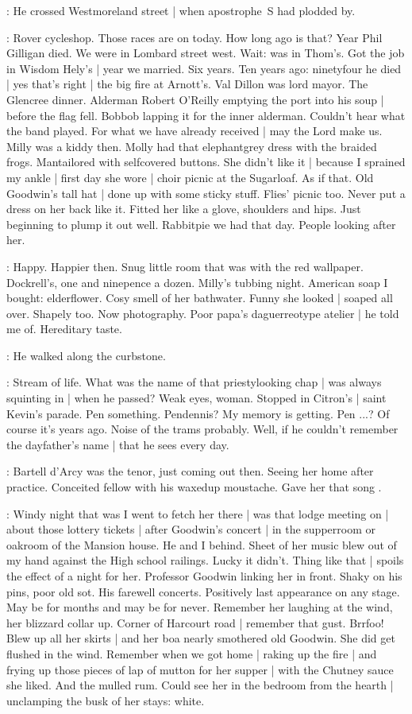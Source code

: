 :
He crossed Westmoreland street |
when apostrophe~S had plodded by.

\BloomInt:
Rover cycleshop.
Those races are on today.
How long ago is that?
Year Phil Gilligan died.
We were in Lombard street west.
Wait:
was in Thom's.
Got the job in Wisdom Hely's |
year we married.
Six years.
Ten years ago:
ninetyfour he died |
yes that's right |
the big fire at Arnott's.
Val Dillon was lord mayor.
The Glencree dinner.
Alderman Robert O'Reilly emptying the port into his soup |
before the flag fell.
Bobbob lapping it for the inner alderman.
Couldn't hear what the band played.
For what we have already received |
may the Lord make us.
Milly was a kiddy then.
Molly had that elephantgrey dress with the braided frogs.
Mantailored with selfcovered buttons.
She didn't like it |
because I sprained my ankle |
first day she wore |
choir picnic at the Sugarloaf.
As if that.
Old Goodwin's tall hat |
done up with some sticky stuff.
Flies' picnic too.
Never put a dress on her back like it.
Fitted her like a glove,
shoulders and hips.
Just beginning to plump it out well.
Rabbitpie we had that day.
People looking after her.


\BloomInt:
Happy.
Happier then.
Snug little room that was with the red wallpaper.
Dockrell's, one and ninepence a dozen.
Milly's tubbing night.
American soap I bought:
elderflower.
Cosy smell of her bathwater.
Funny she looked |
soaped all over.
Shapely too.
Now photography.
Poor papa's daguerreotype atelier |
he told me of.
Hereditary taste.

:
He walked along the curbstone.

\BloomInt:
Stream of life.
What was the name of that priestylooking chap |
was always squinting in |
when he passed?
Weak eyes,
woman.
Stopped in Citron's |
saint Kevin's parade.
Pen something.
Pendennis?
My memory is getting.
Pen ...?
Of course it's years ago.
Noise of the trams probably.
Well, if he couldn't remember the dayfather's name |
that he sees every day.

\BloomInt:
Bartell d'Arcy was the tenor,
just coming out then.
Seeing her home after practice.
Conceited fellow with his waxedup moustache.
Gave her that song
.

\BloomInt:
Windy night that was I went to fetch her there |
was that lodge meeting on |
about those lottery tickets |
after Goodwin's concert |
in the supperroom or oakroom of the Mansion house.
He and I behind.
Sheet of her music blew out of my hand
against the High school railings.
Lucky it didn't.
Thing like that |
spoils the effect of a night for her.
Professor Goodwin linking her in front.
Shaky on his pins,
poor old sot.
His farewell concerts.
Positively last appearance on any stage.
May be for months and may be for never.
Remember her laughing at the wind,
her blizzard collar up.
Corner of Harcourt road |
remember that gust.
Brrfoo!
Blew up all her skirts |
and her boa nearly smothered old Goodwin.
She did get flushed in the wind.
Remember when we got home |
raking up the fire |
and frying up those pieces of lap of mutton for her supper |
with the Chutney sauce she liked.
And the mulled rum.
Could see her in the bedroom from the hearth |
unclamping the busk of her stays:
white.

